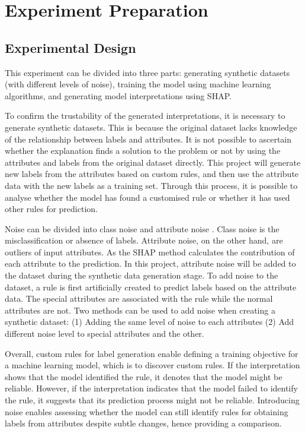 \documentclass[runningheads,a4paper]{llncs}
\begin{document}
\section{Experiment Preparation}

\subsection{Experimental Design}
This experiment can be divided into three parts: generating synthetic datasets (with different levels of noise), training the model using machine learning algorithms, and generating model interpretations using SHAP.

To confirm the trustability of the generated interpretations, it is necessary to generate synthetic datasets. This is because the original dataset lacks knowledge of the relationship between labels and attributes. It is not possible to ascertain whether the explanation finds a solution to the problem or not by using the attributes and labels from the original dataset directly. This project will generate new labels from the attributes based on custom rules, and then use the attribute data with the new labels as a training set.
Through this process, it is possible to analyse whether the model has found a customised rule or whether it has used other rules for prediction.

Noise can be divided into class noise and attribute noise \cite{Zhu2004}. 
Class noise is the misclassification or absence of labels.
Attribute noise, on the other hand, are outliers of input attributes.
As the SHAP method calculates the contribution of each attribute to the prediction.
In this project, attribute noise will be added to the dataset during the synthetic data generation stage.
To add noise to the dataset, a rule is first artificially created to predict labels based on the attribute data. The special attributes are associated with the rule while the normal attributes are not. Two methods can be used to add noise when creating a synthetic dataset: (1) Adding the same level of noise to each attributes (2) Add different noise level to special attributes and the other.

Overall, custom rules for label generation enable defining a training objective for a machine learning model, which is to discover custom rules. If the interpretation shows that the model identified the rule, it denotes that the model might be reliable. However, if the interpretation indicates that the model failed to identify the rule, it suggests that its prediction process might not be reliable.
Introducing noise enables assessing whether the model can still identify rules for obtaining labels from attributes despite subtle changes, hence providing a comparison.
\end{document}
